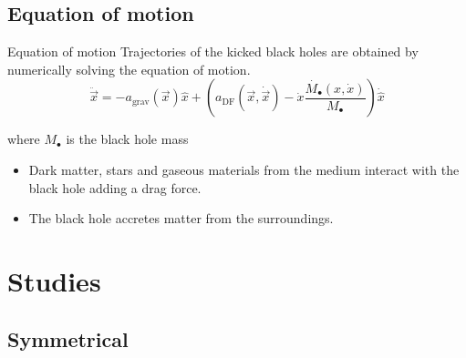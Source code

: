 \documentclass{beamer}
\begin{document}
\subsection{Equation of motion}
	\begin{frame}{Equation of motion}
	Trajectories of the kicked black holes are obtained by numerically solving the equation of motion.
	\begin{equation}\label{eq: equationMotion}
		\ddot{\vec{x}} = -a_\text{grav}(\vec{x})\hat{x} + \left(a_\text{DF}(\vec{x}, \dot{\vec{x}})-\dot{x}\dfrac{\dot{M_\bullet}(x, \dot{x})}{M_\bullet}\right)\dot{\hat{x}} 
	\end{equation}
	
	where $M_\bullet$ is the black hole mass
	
	\begin{itemize}
		\item Dark matter, stars and gaseous materials from the medium interact with the black hole adding a drag force.
		\item The black hole accretes matter from the surroundings.
	\end{itemize}
\end{frame}

\section{Studies}
\subsection{Symmetrical}
\end{document}

